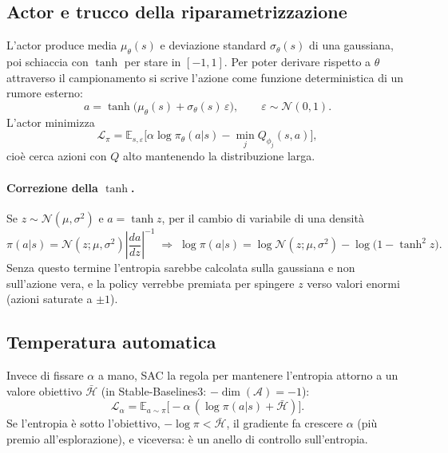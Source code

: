 \documentclass[11pt,a4paper]{article}
\begin{document}
\subsection{Actor e trucco della riparametrizzazione}
L'actor produce media $\mu_\theta(s)$ e deviazione standard $\sigma_\theta(s)$ di una gaussiana, poi
schiaccia con $\tanh$ per stare in $[-1,1]$. Per poter derivare rispetto a $\theta$ attraverso il
campionamento si scrive l'azione come funzione deterministica di un rumore esterno:
\begin{equation}
a = \tanh\big(\mu_\theta(s) + \sigma_\theta(s)\,\varepsilon\big),\qquad \varepsilon\sim\mathcal{N}(0,1).
\end{equation}
L'actor minimizza
\begin{equation}
\mathcal{L}_\pi = \mathbb{E}_{s,\varepsilon}\Big[\alpha\log\pi_\theta(a|s) - \min_{j} Q_{\phi_j}(s,a)\Big],
\end{equation}
cioè cerca azioni con $Q$ alto mantenendo la distribuzione larga.

\paragraph{Correzione della $\tanh$.} Se $z\sim\mathcal{N}(\mu,\sigma^2)$ e $a = \tanh z$, per il
cambio di variabile di una densità
\begin{equation}
\pi(a|s) = \mathcal{N}(z;\mu,\sigma^2)\left|\frac{da}{dz}\right|^{-1}
\;\Rightarrow\;
\log\pi(a|s) = \log\mathcal{N}(z;\mu,\sigma^2) - \log\big(1 - \tanh^2 z\big).
\end{equation}
Senza questo termine l'entropia sarebbe calcolata sulla gaussiana e non sull'azione vera, e la
policy verrebbe premiata per spingere $z$ verso valori enormi (azioni saturate a $\pm1$).

\subsection{Temperatura automatica}
Invece di fissare $\alpha$ a mano, SAC la regola per mantenere l'entropia attorno a un valore
obiettivo $\bar{\mathcal{H}}$ (in Stable-Baselines3: $-\dim(\mathcal{A}) = -1$):
\begin{equation}
\mathcal{L}_\alpha = \mathbb{E}_{a\sim\pi}\big[-\alpha\,(\log\pi(a|s) + \bar{\mathcal{H}})\big].
\end{equation}
Se l'entropia è sotto l'obiettivo, $-\log\pi < \bar{\mathcal{H}}$, il gradiente fa crescere $\alpha$
(più premio all'esplorazione), e viceversa: è un anello di controllo sull'entropia.
\end{document}
